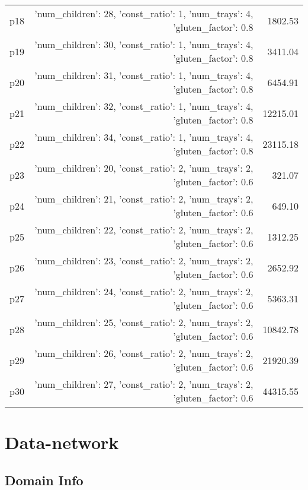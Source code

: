 \documentclass{article}
\begin{document}
\begin{center}
\begin{tabular}{@{}l|r|r@{}}
  p18&{'num\_children': 28, 'const\_ratio': 1, 'num\_trays': 4, 'gluten\_factor': 0.8}&1802.53\\
  p19&{'num\_children': 30, 'const\_ratio': 1, 'num\_trays': 4, 'gluten\_factor': 0.8}&3411.04\\
  p20&{'num\_children': 31, 'const\_ratio': 1, 'num\_trays': 4, 'gluten\_factor': 0.8}&6454.91\\
  p21&{'num\_children': 32, 'const\_ratio': 1, 'num\_trays': 4, 'gluten\_factor': 0.8}&12215.01\\
  p22&{'num\_children': 34, 'const\_ratio': 1, 'num\_trays': 4, 'gluten\_factor': 0.8}&23115.18\\
  p23&{'num\_children': 20, 'const\_ratio': 2, 'num\_trays': 2, 'gluten\_factor': 0.6}&321.07\\
  p24&{'num\_children': 21, 'const\_ratio': 2, 'num\_trays': 2, 'gluten\_factor': 0.6}&649.10\\
  p25&{'num\_children': 22, 'const\_ratio': 2, 'num\_trays': 2, 'gluten\_factor': 0.6}&1312.25\\
  p26&{'num\_children': 23, 'const\_ratio': 2, 'num\_trays': 2, 'gluten\_factor': 0.6}&2652.92\\
  p27&{'num\_children': 24, 'const\_ratio': 2, 'num\_trays': 2, 'gluten\_factor': 0.6}&5363.31\\
  p28&{'num\_children': 25, 'const\_ratio': 2, 'num\_trays': 2, 'gluten\_factor': 0.6}&10842.78\\
  p29&{'num\_children': 26, 'const\_ratio': 2, 'num\_trays': 2, 'gluten\_factor': 0.6}&21920.39\\
  p30&{'num\_children': 27, 'const\_ratio': 2, 'num\_trays': 2, 'gluten\_factor': 0.6}&44315.55
                            \end{tabular}
                            \end{center}
                    
                            \newpage \section{Data-network}
                    \subsection*{Domain Info}
\end{document}
